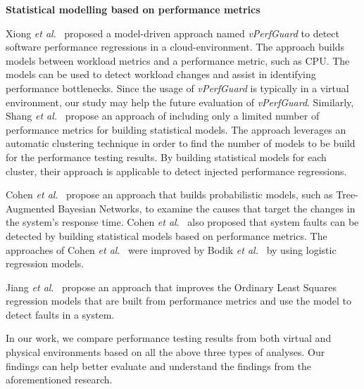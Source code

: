 \noindent \textbf{Statistical modelling based on performance metrics}

Xiong \textit{et al$.$}~\cite{xiong2013vperfguard} proposed a model-driven approach named \textit{vPerfGuard} to detect software performance regressions in a cloud-environment. The approach builds models between workload metrics and a performance metric, such as CPU. The models can be used to detect workload changes and assist in identifying performance bottlenecks. Since the usage of \emph{vPerfGuard} is typically in a virtual environment, our study may help the future evaluation of \textit{vPerfGuard}. Similarly, Shang\textit{ et al.}~\cite{Shang:2015:ADP:2668930.2688052} propose an approach of including only a limited number of performance metrics for building statistical models. The approach leverages an automatic clustering technique in order to find the number of models to be build for the performance testing results. By building statistical models for each cluster, their approach is applicable to detect injected performance regressions. %


Cohen \textit{et al$.$}~\cite{cohen2004correlating} propose an approach that builds probabilistic models, such as Tree-Augmented Bayesian Networks, to examine the causes that target the changes in the system's response time. Cohen \textit{et al$.$}~\cite{Cohen:2005:CIC:1095810.1095821} also proposed that system faults can be detected by building statistical models based on performance metrics. The approaches of Cohen \textit{et al$.$}~\cite{cohen2004correlating, Cohen:2005:CIC:1095810.1095821} were improved by Bodik \textit{et al.}~\cite{bodik2008hilighter} by using logistic regression models.

Jiang \emph{et al$.$}~\cite{Jiang:2009:SMM:1555228.1555233} propose an approach that improves the Ordinary Least Squares regression models that are built from performance metrics and use the model to detect faults in a system. 

In our work, we compare performance testing results from both virtual and physical environments based on all the above three types of analyses. Our findings can help better evaluate and understand the findings from the aforementioned research.




